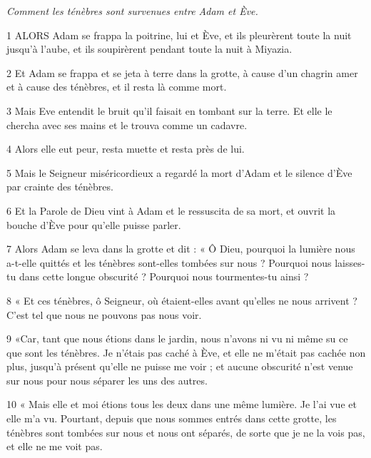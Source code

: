 \par \textit{Comment les ténèbres sont survenues entre Adam et Ève.}

\par 1 ALORS Adam se frappa la poitrine, lui et Ève, et ils pleurèrent toute la nuit jusqu'à l'aube, et ils soupirèrent pendant toute la nuit à Miyazia.

\par 2 Et Adam se frappa et se jeta à terre dans la grotte, à cause d'un chagrin amer et à cause des ténèbres, et il resta là comme mort.

\par 3 Mais Eve entendit le bruit qu'il faisait en tombant sur la terre. Et elle le chercha avec ses mains et le trouva comme un cadavre.

\par 4 Alors elle eut peur, resta muette et resta près de lui.

\par 5 Mais le Seigneur miséricordieux a regardé la mort d'Adam et le silence d'Ève par crainte des ténèbres.

\par 6 Et la Parole de Dieu vint à Adam et le ressuscita de sa mort, et ouvrit la bouche d'Ève pour qu'elle puisse parler.

\par 7 Alors Adam se leva dans la grotte et dit : « Ô Dieu, pourquoi la lumière nous a-t-elle quittés et les ténèbres sont-elles tombées sur nous ? Pourquoi nous laisses-tu dans cette longue obscurité ? Pourquoi nous tourmentes-tu ainsi ?

\par 8 « Et ces ténèbres, ô Seigneur, où étaient-elles avant qu'elles ne nous arrivent ? C’est tel que nous ne pouvons pas nous voir.

\par 9 «Car, tant que nous étions dans le jardin, nous n'avons ni vu ni même su ce que sont les ténèbres. Je n'étais pas caché à Ève, et elle ne m'était pas cachée non plus, jusqu'à présent qu'elle ne puisse me voir ; et aucune obscurité n’est venue sur nous pour nous séparer les uns des autres.

\par 10 « Mais elle et moi étions tous les deux dans une même lumière. Je l'ai vue et elle m'a vu. Pourtant, depuis que nous sommes entrés dans cette grotte, les ténèbres sont tombées sur nous et nous ont séparés, de sorte que je ne la vois pas, et elle ne me voit pas.

